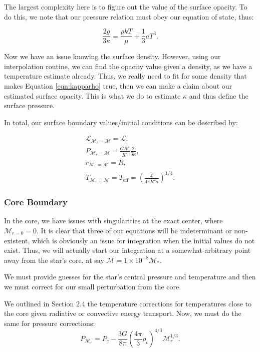 \documentclass[twocolumn]{aastex631}
\begin{document}
The largest complexity here is to figure out the value of the surface opacity. To do this, we note that our pressure relation must obey our equation of state, thus:

\begin{equation}
	\label{eqn:kapparho}
	\frac{2g}{3\kappa} = \frac{\rho k T}{\mu} + \frac{1}{3}aT^3.
\end{equation}

\noindent Now we have an issue knowing the surface density. However, using our interpolation routine, we can find the opacity value given a density, as we have a temperature estimate already. Thus, we really need to fit for some density that makes Equation \ref{eqn:kapparho} true, then we can make a claim about our estimated surface opacity. This is what we do to estimate $\kappa$ and thus define the surface pressure.

In total, our surface boundary values/initial conditions can be described by:

\begin{equation}
\boxed{
\begin{array}{lcl}
\mathcal{L}_{\mathcal{M}_r=\mathcal{M}} = \mathcal{L},\\
P_{\mathcal{M}_r=\mathcal{M}} = \frac{G\mathcal{M}}{R^2}\frac{2}{3\kappa},\\
r_{\mathcal{M}_r=\mathcal{M}} = R,\\
T_{\mathcal{M}_r=\mathcal{M}} = T_\text{eff} = \left(\frac{\mathcal{L}}{4\pi R^2 \sigma}\right)^{1/4}.
\end{array}
}
\end{equation}


\subsubsection{Core Boundary}

In the core, we have issues with singularities at the exact center, where $\mathcal{M}_{r=0} = 0$. It is clear that three of our equations will be indeterminant or non-existent, which is obviously an issue for integration when the initial values do not exist. Thus, we will actually start our integration at a somewhat-arbitrary point away from the star's core, at say $\mathcal{M} = 1\times 10^{-8} \mathcal{M}_*$. 

We must provide guesses for the star's central pressure and temperature and then we must correct for our small perturbation from the core.

We outlined in Section 2.4 the temperature corrections for temperatures close to the core given radiative or convective energy transport. Now, we must do the same for pressure corrections:
\begin{equation}
	P_{\mathcal{M}_r} = P_c - \frac{3G}{8\pi}\left(\frac{4\pi}{3}\rho_c\right)^{4/3}\mathcal{M}_r^{1/3}.
\end{equation}
\end{document}
